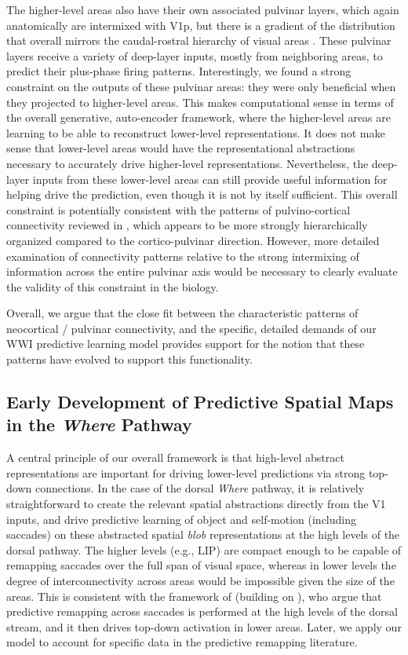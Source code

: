 \documentclass[11pt,twoside]{article}
\newif\myifpdf
\begin{document}
The higher-level areas also have their own associated pulvinar layers, which again anatomically are intermixed with V1p, but there is a gradient of the distribution that overall mirrors the caudal-rostral hierarchy of visual areas \cite{Shipp03}.  These pulvinar layers receive a variety of deep-layer inputs, mostly from neighboring areas, to predict their plus-phase firing patterns.  Interestingly, we found a strong constraint on the outputs of these pulvinar areas: they were only beneficial when they projected to higher-level areas.  This makes computational sense in terms of the overall generative, auto-encoder framework, where the higher-level areas are learning to be able to reconstruct lower-level representations.  It does not make sense that lower-level areas would have the representational abstractions necessary to accurately drive higher-level representations.  Nevertheless, the deep-layer inputs from these lower-level areas can still provide useful information for helping drive the prediction, even though it is not by itself sufficient.  This overall constraint is potentially consistent with the patterns of pulvino-cortical connectivity reviewed in , which appears to be more strongly hierarchically organized compared to the cortico-pulvinar direction.  However, more detailed examination of connectivity patterns relative to the strong intermixing of information across the entire pulvinar axis would be necessary to clearly evaluate the validity of this constraint in the biology.

Overall, we argue that the close fit between the characteristic patterns of neocortical / pulvinar connectivity, and the specific, detailed demands of our WWI predictive learning model provides support for the notion that these patterns have evolved to support this functionality.

\subsection{Early Development of Predictive Spatial Maps in the \emph{Where} Pathway}

A central principle of our overall framework is that high-level abstract representations are important for driving lower-level predictions via strong top-down connections.  In the case of the dorsal {\em Where} pathway, it is relatively straightforward to create the relevant spatial abstractions directly from the V1 inputs, and drive predictive learning of object and self-motion (including saccades) on these abstracted spatial {\em blob} representations at the high levels of the dorsal pathway.  The higher levels (e.g., LIP) are compact enough to be capable of remapping saccades over the full span of visual space, whereas in lower levels the degree of interconnectivity across areas would be impossible given the size of the areas.  This is consistent with the framework of  (building on ), who argue that predictive remapping across saccades is performed at the high levels of the dorsal stream, and it then drives top-down activation in lower areas.  Later, we apply our model to account for specific data in the predictive remapping literature.
\end{document}
